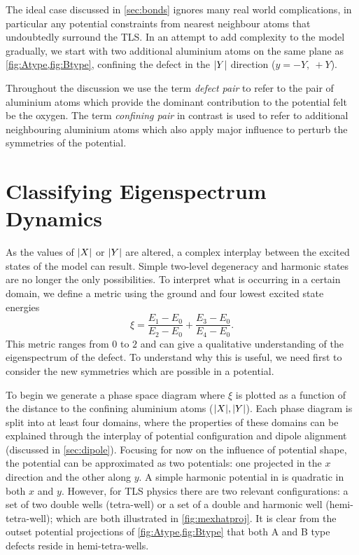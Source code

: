 The ideal case discussed in \cref{sec:bonds} ignores many real world complications, in particular any potential constraints from nearest neighbour atoms that undoubtedly surround the TLS.
In an attempt to add complexity to the model gradually, we start with two additional aluminium atoms on the same plane as \cref{fig:Atype,fig:Btype}, confining the defect in the $\lvert Y\rvert$ direction (\ie $y = -Y, \: +Y$).

Throughout the discussion we use the term \textit{defect pair} to refer to the pair of aluminium atoms which provide the dominant contribution to the potential felt be the oxygen.
The term \textit{confining pair} in contrast is used to refer to additional neighbouring aluminium atoms which also apply major influence to perturb the symmetries of the potential.

\section{Classifying Eigenspectrum Dynamics}\label{sec:dynamics}

As the values of $\lvert X\rvert$ or $\lvert Y\rvert$ are altered, a complex interplay between the excited states of the model can result.
Simple two-level degeneracy and harmonic states are no longer the only possibilities. To interpret what is occurring in a certain domain, we define a metric using the ground and four lowest excited state energies
\begin{equation}
\xi=\frac{E_{1}-E_{0}}{E_{2}-E_{0}}+\frac{E_{3}-E_{0}}{E_{4}-E_{0}}.
\label{eq:ximetric}
\end{equation}
This metric ranges from $0$ to $2$ and can give a qualitative understanding of the eigenspectrum of the defect.
To understand why this is useful, we need first to consider the new symmetries which are possible in a  potential.

To begin we generate a phase space diagram where $\xi$ is plotted as a function of the distance to the confining aluminium atoms ($\lvert X\rvert,\lvert Y\rvert$).
Each phase diagram is split into at least four domains, where the properties of these domains can be explained through the interplay of potential configuration and dipole alignment (discussed in \cref{sec:dipole}).
Focusing for now on the influence of potential shape, the  potential can be approximated as two  potentials: one projected in the $x$ direction and the other along $y$.
A simple harmonic potential in  is quadratic in both $x$ and $y$.
However, for TLS physics there are two relevant configurations: a set of two double wells (tetra-well) or a set of a double and harmonic well (hemi-tetra-well); which are both illustrated in \cref{fig:mexhatproj}.
It is clear from the outset potential projections of \cref{fig:Atype,fig:Btype} that both A and B type defects reside in hemi-tetra-wells.

